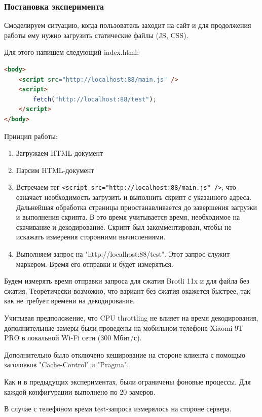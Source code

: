 \documentclass[12pt]{article}
\begin{document}
\subsubsection{Постановка эксперимента}

Смоделируем ситуацию, когда пользователь заходит на сайт и для продолжения работы ему нужно загрузить статические файлы (JS, CSS).

Для этого напишем следующий index.html:

\begin{lstlisting}[language=HTML]
<body>
    <script src="http://localhost:88/main.js" />
    <script>
        fetch("http://localhost:88/test");
    </script>
</body>
\end{lstlisting}

Принцип работы:
\begin{enumerate}
    \item Загружаем HTML-документ
    \item Парсим HTML-документ
    \item Встречаем тег \verb|<script src="http://localhost:88/main.js" />|,
          что означает необходимость загрузить и выполнить скрипт с указанного адреса.
          Дальнейшая обработка страницы приостанавливается до завершения загрузки и выполнения скрипта.
          В это время учитывается время, необходимое на скачивание и декодирование.
          Скрипт был закомментирован, чтобы не искажать измерения сторонними вычислениями.
    \item Выполняем запрос на "http://localhost:88/test". Этот запрос служит маркером. Время его отправки и будет измеряться.
\end{enumerate}

Будем измерять время отправки запроса для сжатия Brotli 11x и для файла без сжатия. Теоретически возможно, что вариант без сжатия окажется быстрее, так как не требует времени на декодирование.

Учитывая предположение, что CPU throttling не влияет на время декодирования, дополнительные замеры были проведены на мобильном телефоне Xiaomi 9T PRO в локальной Wi-Fi сети (300 Мбит/с).

Дополнительно было отключено кеширование на стороне клиента с помощью заголовков "Cache-Control" и "Pragma".

Как и в предыдущих экспериментах, были ограничены фоновые процессы. Для каждой конфигурации выполнено по 20 замеров.

В случае с телефоном время test-запроса измерялось на стороне сервера.
\end{document}
